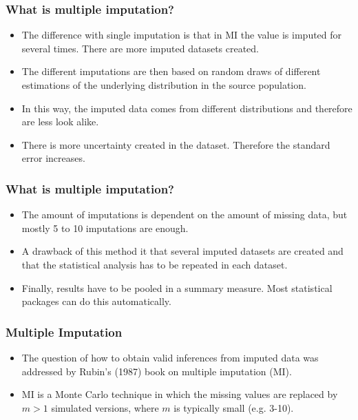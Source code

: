 \documentclass[MASTER.tex]{subfiles}
\begin{document}
\begin{frame}
	\frametitle{What is multiple imputation?}
	\Large
\begin{itemize}
\item The difference with single imputation is that in MI the value is imputed for several times. There are
more imputed datasets created. 
\item The different imputations are then based on random draws of
different estimations of the underlying distribution in the source population. 
\item In this way, the
imputed data comes from different distributions and therefore are less look alike. 
\item There is more
uncertainty created in the dataset. Therefore the standard error increases. 
\end{itemize}

\end{frame}
\begin{frame}
	\frametitle{What is multiple imputation?}
	\Large 
\begin{itemize}
\item The amount of
imputations is dependent on the amount of missing data, but mostly 5 to 10 imputations are
enough. 
\item A drawback of this method it that several imputed datasets are created and that the
statistical analysis has to be repeated in each dataset. \item Finally, results have to be pooled in a
summary measure. Most statistical packages can do this automatically.
\end{itemize}
\end{frame}




	\begin{frame}
		\frametitle{Multiple Imputation}
		\Large
\begin{itemize}
\item The question of how to obtain valid inferences from imputed data was addressed by Rubin's (1987) book on multiple imputation (MI).
\item MI is a Monte Carlo technique in which the missing values are replaced by $m>1$ simulated versions, where $m$ is typically small (e.g. 3-10). 
\end{itemize}

	\end{frame}
\end{document}
